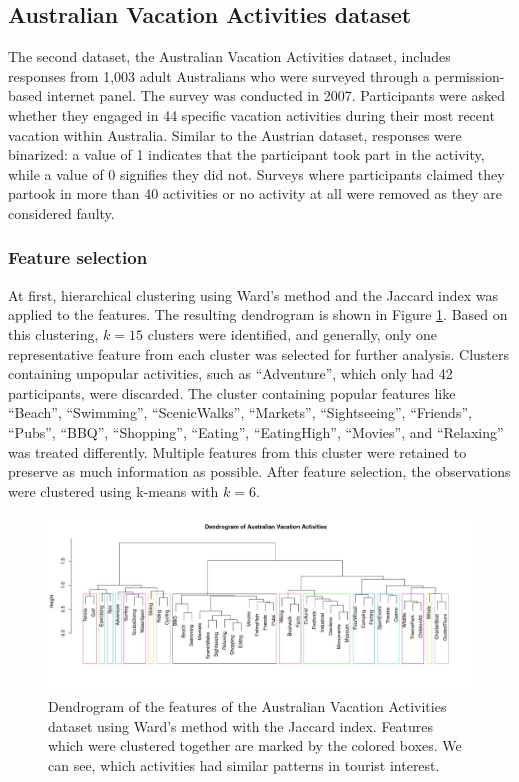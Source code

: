 \documentclass[article]{ajs}
\begin{document}
\subsection{Australian Vacation Activities dataset}

The second dataset, the Australian Vacation Activities dataset, includes responses from 1,003 adult Australians who were surveyed through a permission-based internet panel. The survey was conducted in 2007. Participants were asked whether they engaged in 44 specific vacation activities during their most recent vacation within Australia. Similar to the Austrian dataset, responses were binarized: a value of 1 indicates that the participant took part in the activity, while a value of 0 signifies they did not. Surveys where participants claimed they partook in more than 40 activities or no activity at all were removed as they are considered faulty.

\subsubsection{Feature selection}

At first, hierarchical clustering using Ward's method \citep{murtagh2014ward} and the Jaccard index was applied to the features. The resulting dendrogram is shown in Figure \ref{fig:aus_feature_clustering}. Based on this clustering, \( k = 15 \) clusters were identified, and generally, only one representative feature from each cluster was selected for further analysis. Clusters containing unpopular activities, such as ``Adventure'', which only had 42 participants, were discarded. The cluster containing popular features like ``Beach'', ``Swimming'', ``ScenicWalks'', ``Markets'', ``Sightseeing'', ``Friends'', ``Pubs'', ``BBQ'', ``Shopping'', ``Eating'', ``EatingHigh'', ``Movies'', and ``Relaxing'' was treated differently. Multiple features from this cluster were retained to preserve as much information as possible. After feature selection, the observations were clustered using k-means with \( k = 6 \).


\begin{figure}[h!]
    \centering
    \includegraphics[width=1\textwidth]{aus_feature_clustering.pdf}
    \caption{Dendrogram of the features of the Australian Vacation Activities dataset using Ward's method with the Jaccard index. Features which were clustered together are marked by the colored boxes. We can see, which activities had similar patterns in tourist interest.}
    \label{fig:aus_feature_clustering}
\end{figure}
\end{document}
